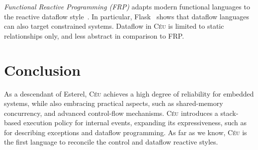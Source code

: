 \documentclass{acm_proc_article-sp}
\newcommand{\CEU}{\textsc{C\'{e}u}\xspace}
\newcommand{\code}[1] {{\small{\texttt{#1}}}}
\newcommand{\1}{\;}
\newcommand{\2}{\;\;}
\newcommand{\3}{\;\;\;}
\newcommand{\5}{\;\;\;\;\;}
\begin{document}
\emph{Functional Reactive Programming (FRP)} adapts modern functional languages 
to the reactive dataflow style~\cite{frp.principles}.
In particular, Flask~\cite{wsn.flask} shows that dataflow languages can also 
target constrained systems.
%
Dataflow in \CEU is limited to static relationships only, and less abstract in 
comparison to FRP.

\section{Conclusion}
\label{sec.conclusion}

As a descendant of Esterel, \CEU achieves a high degree of reliability for 
embedded systems, while also embracing practical aspects, such as
shared-memory concurrency, and advanced control-flow mechanisms.
%
\CEU introduces a stack-based execution policy for internal events, expanding 
its expressiveness, such as for describing exceptions and dataflow programming.
%
As far as we know, \CEU is the first language to reconcile the control and 
dataflow reactive styles.
%
\end{document}
